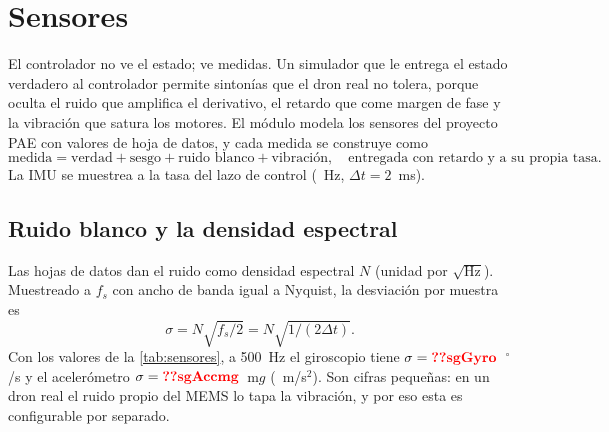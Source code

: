 \section{Sensores}
\label{sec:sensores}

El controlador no ve el estado; ve medidas. Un simulador que le entrega el
estado verdadero al controlador permite sintonías que el dron real no
tolera, porque oculta el ruido que amplifica el derivativo, el retardo que
come margen de fase y la vibración que satura los motores. El módulo
 modela los sensores del proyecto PAE con valores de hoja de
datos, y cada medida se construye como
\begin{equation}
\text{medida} = \text{verdad} + \text{sesgo} + \text{ruido blanco} + \text{vibración},
\quad \text{entregada con retardo y a su propia tasa.}
\end{equation}
La IMU se muestrea a la tasa del lazo de control (~Hz,
$\Delta t=2$~ms).

\subsection{Ruido blanco y la densidad espectral}

Las hojas de datos dan el ruido como densidad espectral $N$ (unidad
por $\sqrt{\text{Hz}}$). Muestreado a $f_s$ con ancho de banda igual a
Nyquist, la desviación por muestra es
\begin{equation}
\sigma = N\sqrt{f_s/2} = N\sqrt{1/(2\Delta t)} .
\label{eq:ruido}
\end{equation}
Con los valores de la \cref{tab:sensores}, a 500~Hz el giroscopio tiene
$\sigma=\val{sgGyro}$~$^\circ$/s y el acelerómetro
$\sigma=\val{sgAccmg}$~m$g$ (~m/s$^2$). Son cifras pequeñas: en un
dron real el ruido propio del MEMS lo tapa la vibración, y por eso esta es
configurable por separado.

